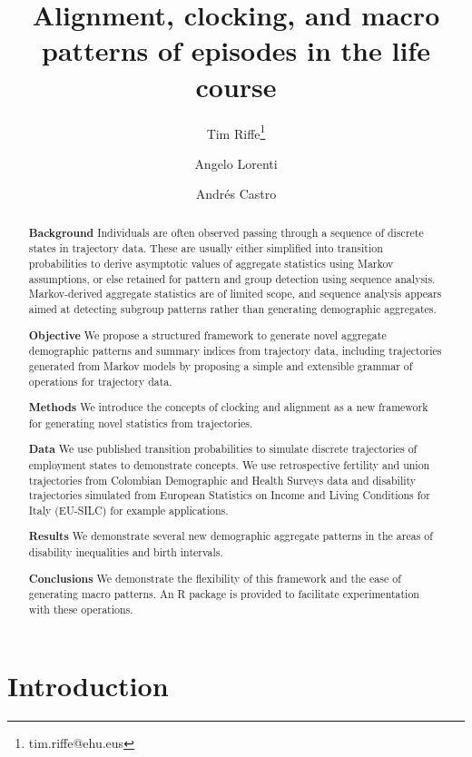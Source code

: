 \documentclass[a4paper,left=1.25cm,right=1.25cm,top=1.25cm,bottom=1.25cm]{article}
\newcommand{\absdiv}[1]{%
  \par\addvspace{.5\baselineskip}%
  \noindent\textbf{#1}\quad\ignorespaces
}
\begin{document}
\title{Alignment, clocking, and macro patterns of episodes in the life course}
\author[1,2,3]{Tim Riffe\thanks{tim.riffe@ehu.eus}}
\author[3]{Angelo Lorenti}
\author[3]{Andr\'{e}s Castro}
\maketitle

\begin{abstract}

\absdiv{Background}Individuals are often observed passing through a sequence of discrete states in trajectory data. These are usually either simplified into transition probabilities to derive asymptotic values of aggregate statistics using Markov assumptions, or else retained for pattern and group detection using sequence analysis. Markov-derived aggregate statistics are of limited scope, and sequence analysis appears aimed at detecting subgroup patterns rather than generating demographic aggregates.
\absdiv{Objective}We propose a structured framework to generate novel aggregate demographic patterns and summary indices from trajectory data, including trajectories generated from Markov models by proposing a simple and extensible grammar of operations for trajectory data.
\absdiv{Methods}We introduce the concepts of clocking and alignment as a new framework for generating novel statistics from trajectories. 
\absdiv{Data}We use published transition probabilities to simulate discrete trajectories of employment states to demonstrate concepts. We use retrospective fertility and union trajectories from Colombian Demographic and Health Surveys data and disability trajectories simulated from European Statistics on Income and Living Conditions for Italy (EU-SILC) for example applications.
\absdiv{Results}We demonstrate  several new demographic aggregate patterns in the areas of disability inequalities and birth intervals.
\absdiv{Conclusions}We demonstrate the flexibility of this framework and the ease of generating macro patterns. An R package is provided to facilitate experimentation with these operations.
\end{abstract}

\doublespacing
\section{Introduction}
\end{document}
